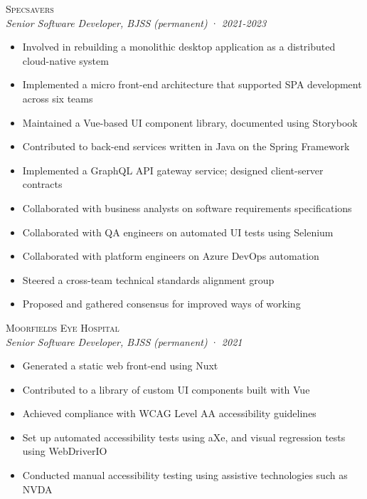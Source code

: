 \documentclass[a4paper,10pt]{article}
\newcommand{\resumeSubheading}[5][12pt]{
  \vspace{#1}
  {\scshape{#2}} \\
  \textit{\small{#3}} \textit{\small{(#4)}} · \textit{\small{#5}}
  \vspace{2pt}
}
\newcommand{\resumeListStart}{\begin{itemize}}
\newcommand{\resumeListEnd}{\end{itemize}}
\newcommand{\resumeItem}[1]{
  \item[\-·]\small{{#1\vspace{1pt}}}
}
\begin{document}
  \begin{minipage}{\textwidth}
    \resumeSubheading
      {Specsavers}
      {Senior Software Developer, BJSS}
      {permanent}
      {2021-2023}
    \resumeListStart
      \resumeItem{Involved in rebuilding a monolithic desktop application as a distributed cloud-native system}
      \resumeItem{Implemented a micro front-end architecture that supported SPA development across six teams}
      \resumeItem{Maintained a Vue-based UI component library, documented using Storybook}
      \resumeItem{Contributed to back-end services written in Java on the Spring Framework}
      \resumeItem{Implemented a GraphQL API gateway service; designed client-server contracts}
      \resumeItem{Collaborated with business analysts on software requirements specifications}
      \resumeItem{Collaborated with QA engineers on automated UI tests using Selenium}
      \resumeItem{Collaborated with platform engineers on Azure DevOps automation}
      \resumeItem{Steered a cross-team technical standards alignment group}
      \resumeItem{Proposed and gathered consensus for improved ways of working}
    \resumeListEnd
  \end{minipage}


  \begin{minipage}{\textwidth}
    \resumeSubheading
      {Moorfields Eye Hospital}
      {Senior Software Developer, BJSS}
      {permanent}
      {2021}
    \resumeListStart
      \resumeItem{Generated a static web front-end using Nuxt}
      \resumeItem{Contributed to a library of custom UI components built with Vue}
      \resumeItem{Achieved compliance with WCAG Level AA accessibility guidelines}
      \resumeItem{Set up automated accessibility tests using aXe, and visual regression tests using WebDriverIO}
      \resumeItem{Conducted manual accessibility testing using assistive technologies such as NVDA}
    \resumeListEnd
  \end{minipage}
\end{document}
